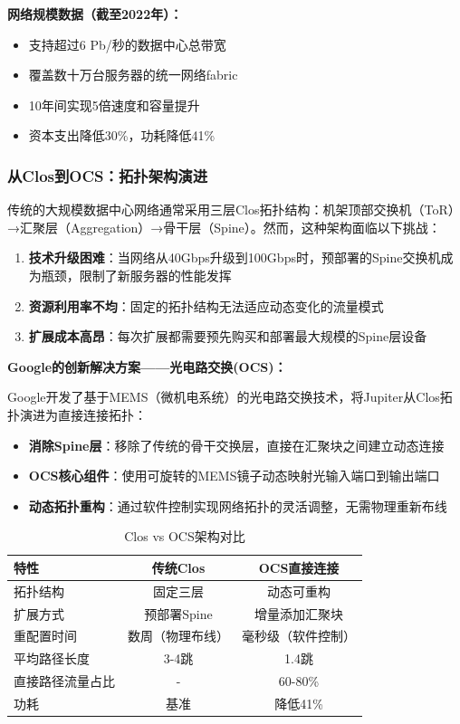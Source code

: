 \textbf{网络规模数据（截至2022年）：}
\begin{itemize}
    \item 支持超过6 Pb/秒的数据中心总带宽
    \item 覆盖数十万台服务器的统一网络fabric
    \item 10年间实现5倍速度和容量提升
    \item 资本支出降低30\%，功耗降低41\%
\end{itemize}

\subsubsection{从Clos到OCS：拓扑架构演进}

传统的大规模数据中心网络通常采用三层Clos拓扑结构：机架顶部交换机（ToR）→汇聚层（Aggregation）→骨干层（Spine）。然而，这种架构面临以下挑战：

\begin{enumerate}
    \item \textbf{技术升级困难}：当网络从40Gbps升级到100Gbps时，预部署的Spine交换机成为瓶颈，限制了新服务器的性能发挥
    \item \textbf{资源利用率不均}：固定的拓扑结构无法适应动态变化的流量模式
    \item \textbf{扩展成本高昂}：每次扩展都需要预先购买和部署最大规模的Spine层设备
\end{enumerate}

\textbf{Google的创新解决方案——光电路交换(OCS)：}

Google开发了基于MEMS（微机电系统）的光电路交换技术，将Jupiter从Clos拓扑演进为直接连接拓扑：

\begin{itemize}
    \item \textbf{消除Spine层}：移除了传统的骨干交换层，直接在汇聚块之间建立动态连接
    \item \textbf{OCS核心组件}：使用可旋转的MEMS镜子动态映射光输入端口到输出端口
    \item \textbf{动态拓扑重构}：通过软件控制实现网络拓扑的灵活调整，无需物理重新布线
\end{itemize}

\begin{table}[htbp]
\centering
\caption{Clos vs OCS架构对比}
\begin{tabular}{|l|c|c|}
\hline
\textbf{特性} & \textbf{传统Clos} & \textbf{OCS直接连接} \\
\hline
拓扑结构 & 固定三层 & 动态可重构 \\
扩展方式 & 预部署Spine & 增量添加汇聚块 \\
重配置时间 & 数周（物理布线） & 毫秒级（软件控制） \\
平均路径长度 & 3-4跳 & 1.4跳 \\
直接路径流量占比 & - & 60-80\% \\
功耗 & 基准 & 降低41\% \\
\hline
\end{tabular}
\end{table}

